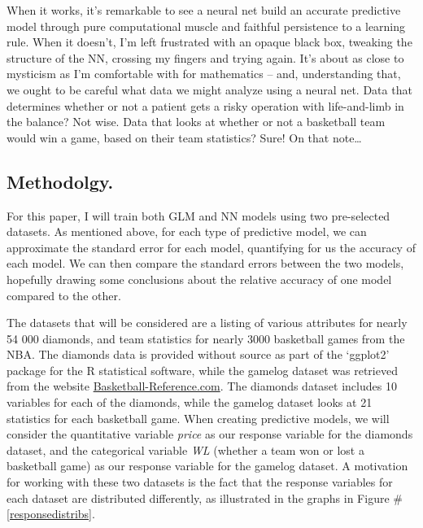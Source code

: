 \documentclass[12pt]{article}
\begin{document}
When it works, it's remarkable to see a neural net build an accurate predictive model through pure computational muscle and faithful persistence to a learning rule.  When it doesn't, I'm left frustrated with an opaque black box, tweaking the structure of the NN, crossing my fingers and trying again.  It's about as close to mysticism as I'm comfortable with for mathematics -- and, understanding that, we ought to be careful what data we might analyze using a neural net.  Data that determines whether or not a patient gets a risky operation with life-and-limb in the balance?  Not wise.  Data that looks at whether or not a basketball team would win a game, based on their team statistics?  Sure!  On that note\dots


\subsection{Methodolgy.}

		For this paper, I will train both GLM and NN models using two pre-selected datasets.  As mentioned above, for each type of
predictive model, we can approximate the standard error for each model, quantifying for us the accuracy of each model.  We can then compare the 
standard errors between the two models, hopefully drawing some conclusions about the relative accuracy of one model compared to the other.

The datasets that will be considered are a listing of various attributes for nearly 54 000 diamonds, and team statistics for nearly 3000 
basketball games from the NBA.  The diamonds data is provided without source as part of the `ggplot2' package for the R statistical software, while
the gamelog dataset was retrieved from the website \href{https://www.basketball-reference.com}{Basketball-Reference.com}.  The diamonds dataset includes 
10 variables for each of the diamonds, while the gamelog dataset looks at 21 statistics for each basketball game.  When creating predictive models, we will 
consider the quantitative variable \textit{price} as our response variable for the diamonds dataset, and the categorical variable \textit{WL} (whether a team won 
or lost a basketball game) as our response variable for the gamelog dataset.  A motivation for working with these two datasets is the fact that the  
response variables for each dataset are distributed differently, as illustrated in the graphs in Figure \#\ref{responsedistribs}.
\end{document}
